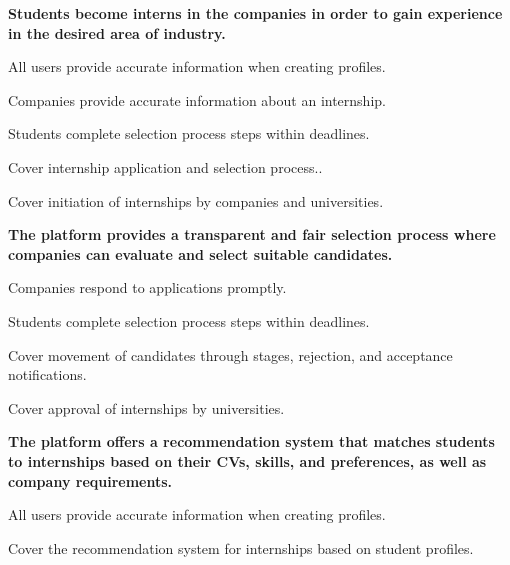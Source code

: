 \begin{enumerate}[label={\textbf{[G\arabic*]}}]
    \item \textbf{Students become interns in the companies in order to gain experience in the desired area of industry.}
    \begin{enumerate}[label={\textbf{[D\arabic*]}}]
        \item[\textbf{[D2]}] All users provide accurate information when creating profiles.
        \item[\textbf{[D4]}] Companies provide accurate information about an internship.
        \item[\textbf{[D8]}] Students complete selection process steps within deadlines.
    \end{enumerate}
    \begin{enumerate}[label={\textbf{[D\arabic*]}}]
        \item[\textbf{[FR28-FR30]}] Cover internship application and selection process..
        \item[\textbf{[FR32]}] Cover initiation of internships by companies and universities.
    \end{enumerate}
    
    \item \textbf{The platform provides a transparent and fair selection process where companies can evaluate and select suitable candidates.}
    \begin{enumerate}[label={\textbf{[D\arabic*]}}]
        \item[\textbf{[D7]}] Companies respond to applications promptly.
        \item[\textbf{[D8]}] Students complete selection process steps within deadlines.
    \end{enumerate}
    \begin{enumerate}[label={\textbf{[D\arabic*]}}]
        \item[\textbf{[FR29-FR31]}] Cover movement of candidates through stages, rejection, and acceptance notifications.
        \item[\textbf{[FR32]}] Cover approval of internships by universities.
    \end{enumerate}
    
    \item \textbf{The platform offers a recommendation system that matches students to internships based on their CVs, skills, and preferences, as well as company requirements.}
    \begin{enumerate}[label={\textbf{[D\arabic*]}}]
        \item[\textbf{[D2]}] All users provide accurate information when creating profiles.
    \end{enumerate}
    \begin{enumerate}[label={\textbf{[D\arabic*]}}]
         \item[\textbf{[FR26]}] Cover the recommendation system for internships based on student profiles.
    \end{enumerate}
    

\end{enumerate}
